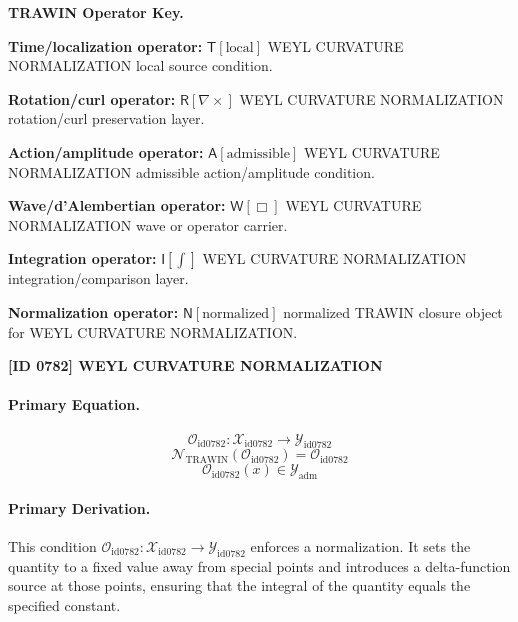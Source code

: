 \par\vspace{0.45\baselineskip}
\noindent\begin{minipage}[t]{\linewidth}
\begingroup
\small
\raggedright
\textbf{TRAWIN Operator Key.}\par
\noindent\textbf{Time/localization operator:} $\mathsf{T}\!\left[\mathrm{local}\right]$ WEYL CURVATURE NORMALIZATION local source condition.\par
\noindent\textbf{Rotation/curl operator:} $\mathsf{R}\!\left[\nabla\times\right]$ WEYL CURVATURE NORMALIZATION rotation/curl preservation layer.\par
\noindent\textbf{Action/amplitude operator:} $\mathsf{A}\!\left[\mathrm{admissible}\right]$ WEYL CURVATURE NORMALIZATION admissible action/amplitude condition.\par
\noindent\textbf{Wave/d'Alembertian operator:} $\mathsf{W}\!\left[\Box\right]$ WEYL CURVATURE NORMALIZATION wave or operator carrier.\par
\noindent\textbf{Integration operator:} $\mathsf{I}\!\left[\int\right]$ WEYL CURVATURE NORMALIZATION integration/comparison layer.\par
\noindent\textbf{Normalization operator:} $\mathsf{N}\!\left[\mathrm{normalized}\right]$ normalized TRAWIN closure object for WEYL CURVATURE NORMALIZATION.\par
\endgroup
\end{minipage}

\clearpage
\noindent\textbf{[ID 0782] WEYL CURVATURE NORMALIZATION}\par
\vspace{0.35em}
\paragraph{Primary Equation.}
\[
\mathcal{O}_{\mathrm{id0782}}:\mathcal{X}_{\mathrm{id0782}}\longrightarrow\mathcal{Y}_{\mathrm{id0782}}
\]
\[
\mathcal{N}_{\mathrm{TRAWIN}}(\mathcal{O}_{\mathrm{id0782}})=\mathcal{O}_{\mathrm{id0782}}
\]
\[
\mathcal{O}_{\mathrm{id0782}}(x)\in\mathcal{Y}_{\mathrm{adm}}
\]

\paragraph{Primary Derivation.}
This condition \( \mathcal{O}_{\mathrm{id0782}}:\mathcal{X}_{\mathrm{id0782}}\longrightarrow\mathcal{Y}_{\mathrm{id0782}} \) enforces a normalization. It sets the quantity to a fixed value away from special points and introduces a delta-function source at those points, ensuring that the integral of the quantity equals the specified constant.
